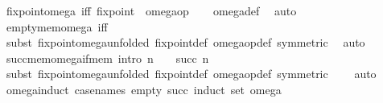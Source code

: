 \begin{isabellebody}
\isanewline
{}\isamarkupfalse%
\ fixpoint{\isacharunderscore}{\kern0pt}omega\ {\isacharbrackleft}{\kern0pt}iff{\isacharbrackright}{\kern0pt}{\isacharcolon}{\kern0pt}\ {\isachardoublequoteopen}fixpoint\ {\isasymomega}\ omega{\isacharunderscore}{\kern0pt}op{\isachardoublequoteclose}\isanewline
%
\isadelimproof
\ \ %
\endisadelimproof
%
\isatagproof
{}\isamarkupfalse%
\ omega{\isacharunderscore}{\kern0pt}def\ \isamarkupfalse%
\ auto%
\endisatagproof
{\isafoldproof}%
%
\isadelimproof
\isanewline
%
\endisadelimproof
\isanewline
{}\isamarkupfalse%
\ empty{\isacharunderscore}{\kern0pt}mem{\isacharunderscore}{\kern0pt}omega\ {\isacharbrackleft}{\kern0pt}iff{\isacharbrackright}{\kern0pt}{\isacharcolon}{\kern0pt}\ {\isachardoublequoteopen}{\isacharbraceleft}{\kern0pt}{\isacharbraceright}{\kern0pt}\ {\isasymin}\ {\isasymomega}{\isachardoublequoteclose}\isanewline
%
\isadelimproof
\ \ %
\endisadelimproof
%
\isatagproof
{}\isamarkupfalse%
\ {\isacharparenleft}{\kern0pt}subst\ fixpoint{\isacharunderscore}{\kern0pt}omega{\isacharbrackleft}{\kern0pt}unfolded\ fixpoint{\isacharunderscore}{\kern0pt}def\ omega{\isacharunderscore}{\kern0pt}op{\isacharunderscore}{\kern0pt}def{\isacharcomma}{\kern0pt}\ symmetric{\isacharbrackright}{\kern0pt}{\isacharparenright}{\kern0pt}\isanewline
\ \ auto%
\endisatagproof
{\isafoldproof}%
%
\isadelimproof
\isanewline
%
\endisadelimproof
\isanewline
{}\isamarkupfalse%
\ succ{\isacharunderscore}{\kern0pt}mem{\isacharunderscore}{\kern0pt}omega{\isacharunderscore}{\kern0pt}if{\isacharunderscore}{\kern0pt}mem\ {\isacharbrackleft}{\kern0pt}intro{\isacharbang}{\kern0pt}{\isacharbrackright}{\kern0pt}{\isacharcolon}{\kern0pt}\ {\isachardoublequoteopen}n\ {\isasymin}\ {\isasymomega}\ {\isasymLongrightarrow}\ succ\ n\ {\isasymin}\ {\isasymomega}{\isachardoublequoteclose}\isanewline
%
\isadelimproof
\ \ %
\endisadelimproof
%
\isatagproof
{}\isamarkupfalse%
\ {\isacharparenleft}{\kern0pt}subst\ fixpoint{\isacharunderscore}{\kern0pt}omega{\isacharbrackleft}{\kern0pt}unfolded\ fixpoint{\isacharunderscore}{\kern0pt}def\ omega{\isacharunderscore}{\kern0pt}op{\isacharunderscore}{\kern0pt}def{\isacharcomma}{\kern0pt}\ symmetric{\isacharbrackright}{\kern0pt}{\isacharparenright}{\kern0pt}\isanewline
\ \ \ \ auto%
\endisatagproof
{\isafoldproof}%
%
\isadelimproof
\isanewline
%
\endisadelimproof
\isanewline
{}\isamarkupfalse%
\ omega{\isacharunderscore}{\kern0pt}induct\ {\isacharbrackleft}{\kern0pt}case{\isacharunderscore}{\kern0pt}names\ empty\ succ{\isacharcomma}{\kern0pt}\ induct\ set{\isacharcolon}{\kern0pt}\ omega{\isacharbrackright}{\kern0pt}{\isacharcolon}{\kern0pt}\isanewline

\end{isabellebody}
